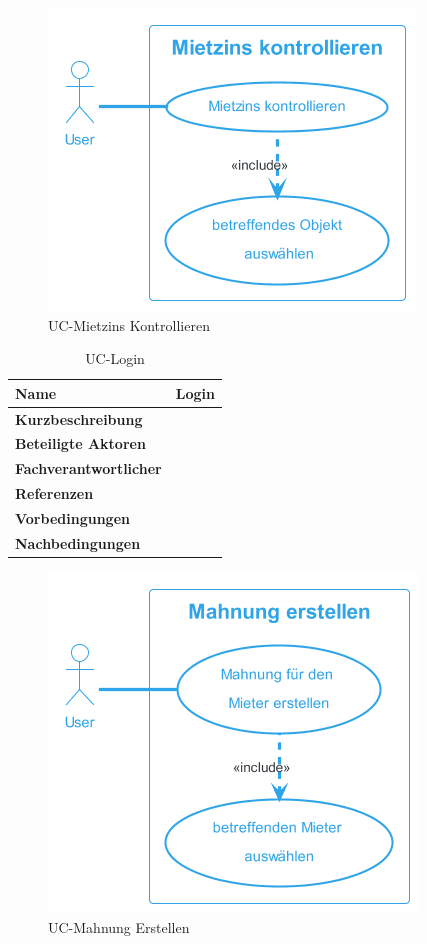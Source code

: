 \begin{figure}[H]
  \begin{center}
    \includegraphics[width=0.4\linewidth]{content/diagrams/out/usecase/mietzinsKontrollieren/MietzinsKontrollieren.png}
    \caption{UC-Mietzins Kontrollieren}
  \end{center}
  \label{MietzinsKontrollieren}
\end{figure}

\begin{table}[H]
  \centering
  \settowidth{}
  \setlength\extrarowheight{2pt}
  \begin{tabulary}{1.0\textwidth}{|a|m{12cm}|}
    \hline
    \textbf{Name}& Login\\
    \hline 
    \textbf{Kurzbeschreibung} & \\
    \hline
    \textbf{Beteiligte Aktoren} & \\
    \hline
    \textbf{Fachverantwortlicher} & \\
    \hline
    \textbf{Referenzen} & \\
    \hline
    \textbf{Vorbedingungen} & \\
    \hline
    \textbf{Nachbedingungen} & \\
    \hline
  \end{tabulary}
  \caption{UC-Login}
\end{table}

\begin{figure}[H]
  \begin{center}
    \includegraphics[width=0.4\linewidth]{content/diagrams/out/usecase/mahnungGenerieren/MahnungErstellen.png}
    \caption{UC-Mahnung Erstellen}
  \end{center}
  \label{mahnung}
\end{figure}

